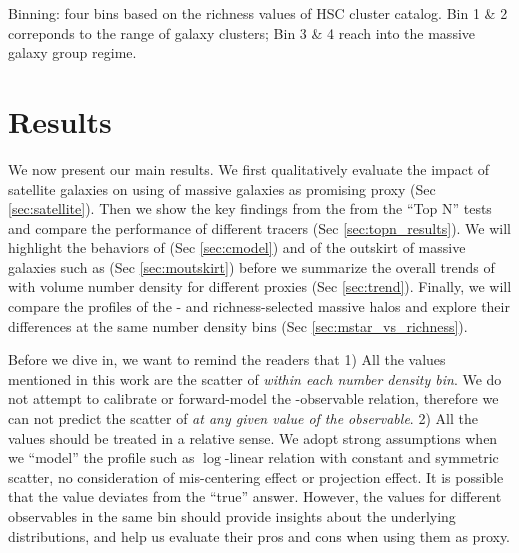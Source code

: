 \documentclass[a4paper,fleqn,usenatbib]{mnras}
\begin{document}
Binning:  four bins based on the richness values of HSC \redm{} cluster
            catalog. Bin 1 \& 2 correponds to the \mvir{} range of galaxy clusters;
            Bin 3 \& 4 reach into the massive galaxy group regime.
            
            


\section{Results}
    \label{sec:result}

    We now present our main results. We first qualitatively evaluate the impact of satellite galaxies on using \mstar{} of massive
    galaxies as promising \mvir{} proxy (Sec \ref{sec:satellite}).
    Then we show the key findings from the from the ``Top N'' tests and compare the performance
    of different \mvir{} tracers (Sec \ref{sec:topn_results}).
    We will highlight the behaviors of \mcmodel{} (Sec \ref{sec:cmodel}) and \mstar{}
    of the outskirt of massive galaxies such as  (Sec \ref{sec:moutskirt})
    before we summarize the overall trends of \sigmh{} with volume number density for different
    \mvir{} proxies (Sec \ref{sec:trend}).
    Finally, we will compare the \dsigma{} profiles of the \mstar{}- and richness-selected
    massive halos and explore their differences at the same number density bins
    (Sec \ref{sec:mstar_vs_richness}).

    Before we dive in, we want to remind the readers that
    1) All the \sigmh{} values mentioned in this work are the scatter of \mvir{} \emph{within each
    number density bin}. We do not attempt to calibrate or forward-model the \mvir{}-observable
    relation, therefore we can not predict the scatter of \mvir{} \emph{at any given value of
    the observable}.
    2) All the \sigmh{} values should be treated in a relative sense. We adopt strong
    assumptions when we ``model'' the \dsigma{} profile such as $\log$-linear relation with
    constant and symmetric scatter, no consideration of mis-centering effect or projection effect.
    It is possible that the \sigmh{} value deviates from the ``true'' answer.
    However, the \sigmh{} values for different observables in the same bin should provide
    insights about the underlying \mvir{} distributions, and help us evaluate their pros and cons
    when using them as \mvir{} proxy.
\end{document}
